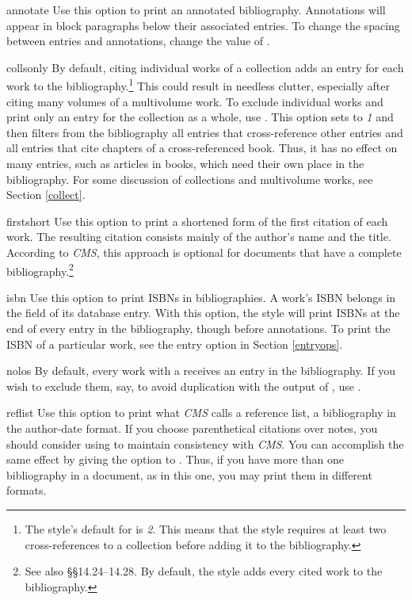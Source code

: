 \documentclass[11pt,letterpaper,oneside]{article}
\begin{document}
\begin{marglist}

\item[annotate] Use this option to print an annotated bibliography.
Annotations will appear in block paragraphs below their associated
entries. To change the spacing between entries and annotations, change
the value of .

\item[collsonly] By default, citing individual works of a collection
adds an entry for each work to the bibliography.\footnote{The style's
default for  is \textit{2}. This means that the
style requires at least two cross-references to a collection before
adding it to the bibliography.} This could result in needless clutter,
especially after citing many volumes of a multivolume work. To exclude
individual works and print only an entry for the collection as a
whole, use . This option sets  to
\textit{1} and then filters from the bibliography all 
entries that cross-reference other entries and all
 entries that cite chapters of a
cross-referenced book. Thus, it has no effect on many
 entries, such as articles in books, which need
their own place in the bibliography. For some discussion of
collections and multivolume works, see Section \ref{collect}.

\item[firstshort] Use this option to print a shortened form of the
first citation of each work. The resulting citation consists mainly of
the author's name and the title. According to \textit{CMS}, this
approach is optional for documents that have a complete
bibliography.\footnote{\cite[\S14.14]{chicago2010} See also
\S\S14.24--14.28. By default, the style adds every cited work to the
bibliography.}

\item[isbn] Use this option to print ISBNs in bibliographies. A work's
ISBN belongs in the  field of its database entry. With
this option, the style will print ISBNs at the end of every entry in
the bibliography, though before annotations. To print the ISBN of a
particular work, see the  entry option in Section
\ref{entryops}.

\item[nolos] By default, every work with a 
receives an entry in the bibliography. If you wish to exclude them,
say, to avoid duplication with the output of ,
use .

\item[reflist] Use this option to print what \textit{CMS} calls a
reference list, a bibliography in the author-date format. If you
choose parenthetical citations over notes, you should consider using
 to maintain consistency with \textit{CMS}. You can
accomplish the same effect by giving the option  to
. Thus, if you have more than one bibliography
in a document, as in this one, you may print them in different
formats.

\end{marglist}
\end{document}
